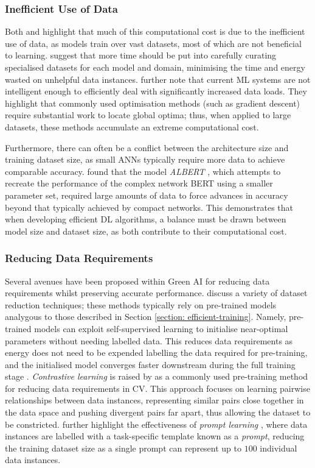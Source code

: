 \documentclass[a4paper, 11pt]{report}
\begin{document}
    \subsubsection{Inefficient Use of Data}

    Both \citet{bender-2021} and \citet{walsh-2021} highlight that much of this computational cost is due to the inefficient use of data, as models train over vast datasets, most of which are not beneficial to learning. \citeauthor{bender-2021} suggest that more time should be put into carefully curating specialised datasets for each model and domain, minimising the time and energy wasted on unhelpful data instances. \citet{aljarrah-2015} further note that current ML systems are not intelligent enough to efficiently deal with significantly increased data loads. They highlight that commonly used optimisation methods (such as gradient descent) require substantial work to locate global optima; thus, when applied to large datasets, these methods accumulate an extreme computational cost.

    Furthermore, there can often be a conflict between the architecture size and training dataset size, as small ANNs typically require more data to achieve comparable accuracy. \citet{bender-2021} found that the model \emph{ALBERT} \citep{lan-2020}, which attempts to recreate the performance of the complex network BERT using a smaller parameter set, required large amounts of data to force advances in accuracy beyond that typically achieved by compact networks. This demonstrates that when developing efficient DL algorithms, a balance must be drawn between model size and dataset size, as both contribute to their computational cost.


    \subsubsection{Reducing Data Requirements}

    Several avenues have been proposed within Green AI for reducing data requirements whilst preserving accurate performance. \citet{xu-2021} discuss a variety of dataset reduction techniques; these methods typically rely on pre-trained models analygous to those described in Section \ref{section: efficient-training}. Namely, pre-trained models can exploit self-supervised learning to initialise near-optimal parameters without needing labelled data. This reduces data requirements as energy does not need to be expended labelling the data required for pre-training, and the initialised model converges faster downstream during the full training stage \citep{xu-2021}. \emph{Contrastive learning} \citep{chen-2020} is raised by \citet{xu-2021} as a commonly used pre-training method for reducing data requirements in CV. This approach focuses on learning pairwise relationships between data instances, representing similar pairs close together in the data space and pushing divergent pairs far apart, thus allowing the dataset to be constricted. \citet{xu-2021} further highlight the effectiveness of \emph{prompt learning} \citep{liu-2021}, where data instances are labelled with a task-specific template known as a \emph{prompt}, reducing the training dataset size as a single prompt can represent up to $100$ individual data instances. 
\end{document}
